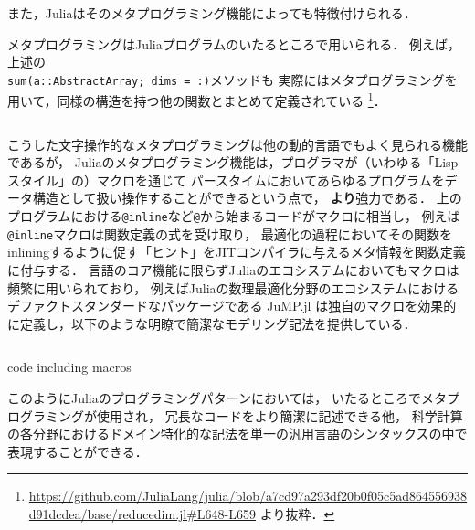 また，Juliaはそのメタプログラミング機能によっても特徴付けられる．

メタプログラミングはJuliaプログラムのいたるところで用いられる．
例えば，上述の\\\verb|sum(a::AbstractArray; dims = :)|メソッドも
実際にはメタプログラミングを用いて，同様の構造を持つ他の関数とまとめて定義されている
\footnote{
  \url{https://github.com/JuliaLang/julia/blob/a7cd97a293df20b0f05c5ad864556938d91dcdea/base/reducedim.jl\#L648-L659}
  より抜粋．
}．

\inputminted[frame=lines, firstline=3, lastline=12, breaklines]{julia}{src/sums_def.jl}

こうした文字操作的なメタプログラミングは他の動的言語でもよく見られる機能であるが，
Juliaのメタプログラミング機能は，プログラマが（いわゆる「Lispスタイル」の）マクロを通じて
パースタイムにおいてあらゆるプログラムをデータ構造として扱い操作することができるという点で，
\textbf{より}強力である．
上のプログラムにおける\verb|@inline|など\verb|@|から始まるコードがマクロに相当し，
例えば\verb|@inline|マクロは関数定義の式を受け取り，
最適化の過程においてその関数をinliningするように促す「ヒント」をJITコンパイラに与えるメタ情報を関数定義に付与する．
言語のコア機能に限らずJuliaのエコシステムにおいてもマクロは頻繁に用いられており，
例えばJuliaの数理最適化分野のエコシステムにおけるデファクトスタンダードなパッケージである
JuMP.jl\cite{DunningHuchetteLubin2017}
は独自のマクロを効果的に定義し，以下のような明瞭で簡潔なモデリング記法を提供している．

\begin{listing}[ht]
  \inputminted[frame=lines, linenos, firstnumber=1, firstline=4, lastline=10]{julia}{src/jump.jl}
  \caption{code including macros}
  \label{lst:target2}
\end{listing}

このようにJuliaのプログラミングパターンにおいては，
いたるところでメタプログラミングが使用され\footnotemark，
冗長なコードをより簡潔に記述できる他，
科学計算の各分野におけるドメイン特化的な記法を単一の汎用言語のシンタックスの中で表現することができる\cite{jeff-phd}．



